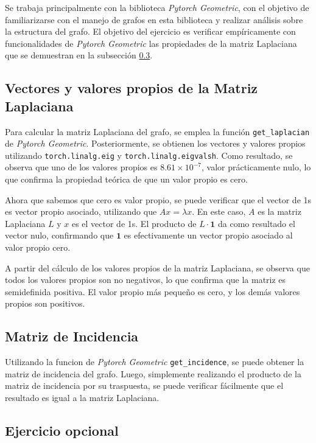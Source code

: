 \documentclass{article}
\begin{document}
Se trabaja principalmente con la biblioteca \textit{Pytorch Geometric}, con el objetivo de familiarizarse con el manejo de grafos en esta biblioteca y realizar análisis sobre la estructura del grafo. El objetivo del ejercicio es verificar empíricamente con funcionalidades de \textit{Pytorch Geometric} las propiedades de la matriz Laplaciana que se demuestran en la subsección \ref{subsec:opcional}.

\subsection{Vectores y valores propios de la Matriz Laplaciana}
Para calcular la matriz Laplaciana del grafo, se emplea la función \verb|get_laplacian| de \textit{Pytorch Geometric}. Posteriormente, se obtienen los vectores y valores propios utilizando \verb|torch.linalg.eig| y \verb|torch.linalg.eigvalsh|. Como resultado, se observa que uno de los valores propios es $8.61 \times 10^{-7}$, valor prácticamente nulo, lo que confirma la propiedad teórica de que un valor propio es cero.

Ahora que sabemos que cero es valor propio, se puede verificar que el vector de 1s es vector propio asociado, utilizando que $Ax = \lambda x$. En este caso, $A$ es la matriz Laplaciana $L$ y $x$ es el vector de 1s. El producto de $L \cdot \mathbf{1}$ da como resultado el vector nulo, confirmando que $\mathbf{1}$ es efectivamente un vector propio asociado al valor propio cero.

A partir del cálculo de los valores propios de la matriz Laplaciana, se observa que todos los valores propios son no negativos, lo que confirma que la matriz es semidefinida positiva. El valor propio más pequeño es cero, y los demás valores propios son positivos.

\subsection{Matriz de Incidencia}
Utilizando la funcion de \textit{Pytorch Geometric} \verb|get_incidence|, se puede obtener la matriz de incidencia del grafo. Luego, simplemente realizando el producto de la matriz de incidencia por su traspuesta, se puede verificar fácilmente que el resultado es igual a la matriz Laplaciana.

\subsection{Ejercicio opcional} \label{subsec:opcional}
\end{document}

